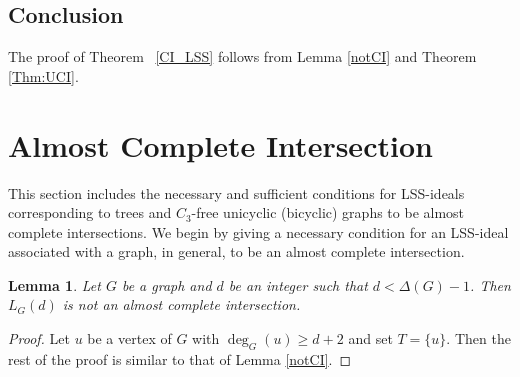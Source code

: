 \documentclass[11pt,a4paper,reqno]{amsart}
\newtheorem{lemma}[thm]{Lemma}
\theoremstyle{definition}
\numberwithin{equation}{section}
\DeclareMathOperator{\het}{ht}
\begin{document}
\subsection*{Conclusion} The proof of Theorem ~\ref{CI_LSS} follows from Lemma \ref{notCI} and Theorem \ref{Thm:UCI}.








\section{Almost Complete Intersection}

This section includes the necessary and sufficient conditions for LSS-ideals corresponding to trees and  $C_3$-free unicyclic (bicyclic) graphs to be almost complete intersections. We begin by giving a necessary condition for an LSS-ideal associated with a graph, in general, to be an almost complete intersection. 

\begin{lemma} \label{lemma:notCIACI}
    Let $G$ be a graph and $d$ be an integer such that $d < \Delta(G)-1$. Then $L_{G}(d)$ is not an almost complete intersection.
\end{lemma}
\begin{proof}
    Let $u$ be a vertex of $G$ with $\deg_G(u) \geq d+2$ %
    and set $T=\{u\}$. Then the rest of the proof is similar to that of Lemma \ref{notCI}.
\end{proof}
\end{document}
